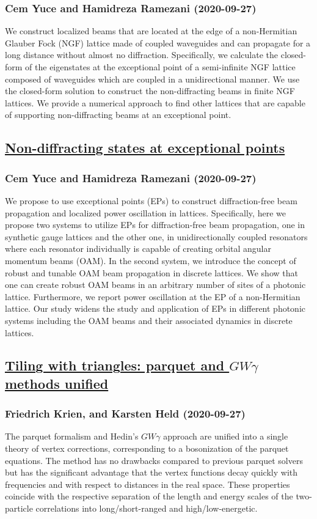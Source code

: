 \subsubsection*{Cem Yuce and Hamidreza Ramezani (2020-09-27)}
We construct localized beams that are located at the edge of a non-Hermitian
Glauber Fock (NGF) lattice made of coupled waveguides and can propagate for a
long distance without almost no diffraction. Specifically, we calculate the
closed-form of the eigenstates at the exceptional point of a semi-infinite NGF
lattice composed of waveguides which are coupled in a unidirectional manner. We
use the closed-form solution to construct the non-diffracting beams in finite
NGF lattices. We provide a numerical approach to find other lattices that are
capable of supporting non-diffracting beams at an exceptional point.

\subsection*{\href{http://arxiv.org/abs/2009.12876v1}{Non-diffracting states at exceptional points}}
\subsubsection*{Cem Yuce and Hamidreza Ramezani (2020-09-27)}
We propose to use exceptional points (EPs) to construct diffraction-free beam
propagation and localized power oscillation in lattices. Specifically, here we
propose two systems to utilize EPs for diffraction-free beam propagation, one
in synthetic gauge lattices and the other one, in unidirectionally coupled
resonators where each resonator individually is capable of creating orbital
angular momentum beams (OAM). In the second system, we introduce the concept of
robust and tunable OAM beam propagation in discrete lattices. We show that one
can create robust OAM beams in an arbitrary number of sites of a photonic
lattice. Furthermore, we report power oscillation at the EP of a non-Hermitian
lattice. Our study widens the study and application of EPs in different
photonic systems including the OAM beams and their associated dynamics in
discrete lattices.

\subsection*{\href{http://arxiv.org/abs/2009.12868v1}{Tiling with triangles: parquet and $GWγ$ methods unified}}
\subsubsection*{Friedrich Krien, and Karsten Held (2020-09-27)}
The parquet formalism and Hedin's $GW\gamma$ approach are unified into a
single theory of vertex corrections, corresponding to a bosonization of the
parquet equations. The method has no drawbacks compared to previous parquet
solvers but has the significant advantage that the vertex functions decay
quickly with frequencies and with respect to distances in the real space. These
properties coincide with the respective separation of the length and energy
scales of the two-particle correlations into long/short-ranged and
high/low-energetic.

